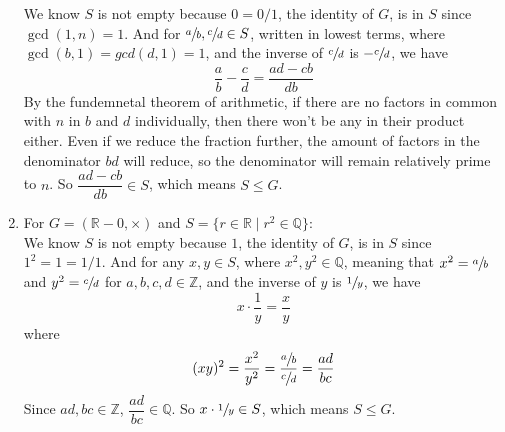 \documentclass{article}
\newcommand{\Z}{\mathbb{Z}}
\newcommand{\Q}{\mathbb{Q}}
\newcommand{\R}{\mathbb{R}}
\begin{document}
\begin{enumerate}[label=\textbf{\alph*.}]
            We know $S$ is not empty because $0 = 0/1$,
            the identity of $G$, is in $S$ since $\gcd(1, n) = 1$.
            And for $\sfrac{a}{b}, \sfrac{c}{d} \in S$,
            written in lowest terms,
            where $\gcd(b, 1) = gcd (d, 1) = 1$,
            and the inverse of $\sfrac{c}{d}$ is $-\sfrac{c}{d}$,
            we have \[\dfrac{a}{b} - \dfrac{c}{d} = \dfrac{ad - cb}{db}\]
            By the fundemnetal theorem of arithmetic,
            if there are no factors in common with $n$ in $b$ and $d$
            individually,
            then there won't be any in their product either.
            Even if we reduce the fraction further,
            the amount of factors in the denominator $bd$ will reduce,
            so the denominator will remain relatively prime to $n$.
            So $\dfrac{ad - cb}{db} \in S$,
            which means $S \leqslant G$. 
        \item 
            For $G = (\R - {0}, \times)$
            and $S = \{r \in \R \mid r^2 \in \Q\}$: \\
            We know $S$ is not empty because $1$,
            the identity of $G$, is in $S$ since $1^2 = 1 = 1/1$.
            And for any $x, y \in S$,
            where $x^2, y^2 \in \Q$,
            meaning that $x^2 = \sfrac{a}{b}$ and $y^2 = \sfrac{c}{d}$ for
            $a, b, c, d \in \Z$,
            and the inverse of $y$ is $\sfrac{1}{y}$,
            we have \[x \cdot \dfrac{1}{y} = \dfrac{x}{y}\]
            where \[(xy)^2 = \dfrac{x^2}{y^2}
            = \dfrac{\sfrac{a}{b}}{\sfrac{c}{d}}
            = \dfrac{ad}{bc}\]
            Since $ad, bc \in \Z$, $\dfrac{ad}{bc} \in \Q$.
            So $x \cdot \sfrac{1}{y} \in S$,
            which means $S \leqslant G$. 
    \end{enumerate}
\end{document}

